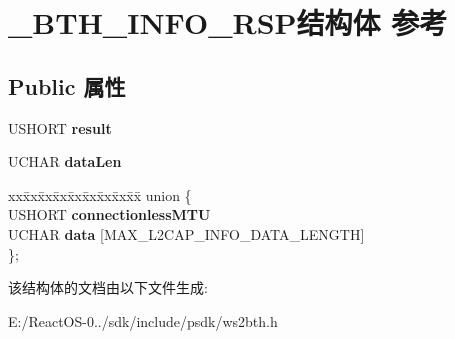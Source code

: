\hypertarget{struct___b_t_h___i_n_f_o___r_s_p}{}\section{\+\_\+\+B\+T\+H\+\_\+\+I\+N\+F\+O\+\_\+\+R\+S\+P结构体 参考}
\label{struct___b_t_h___i_n_f_o___r_s_p}
\subsection*{Public 属性}
\begin{DoxyCompactItemize}
\item 
\mbox{\label{struct___b_t_h___i_n_f_o___r_s_p_af27f464a90aa03560b5c9478c8b8a3fe}} 
U\+S\+H\+O\+RT {\bfseries result}
\item 
\mbox{\label{struct___b_t_h___i_n_f_o___r_s_p_ac9a38b77e3c7a1a08717d4519702d810}} 
U\+C\+H\+AR {\bfseries data\+Len}
\item 
\mbox{\label{struct___b_t_h___i_n_f_o___r_s_p_a0b83ce99bd4db5b1175ce820982da618}} 
\begin{tabbing}
xx\=xx\=xx\=xx\=xx\=xx\=xx\=xx\=xx\=\kill
union \{\\
\>USHORT {\bfseries connectionlessMTU}\\
\>UCHAR {\bfseries data} \mbox{[}MAX\_L2CAP\_INFO\_DATA\_LENGTH\mbox{]}\\
\}; \\

\end{tabbing}\end{DoxyCompactItemize}


该结构体的文档由以下文件生成\+:\begin{DoxyCompactItemize}
\item 
E\+:/\+React\+O\+S-\/0../sdk/include/psdk/ws2bth.\+h\end{DoxyCompactItemize}
